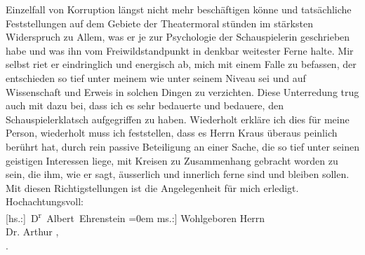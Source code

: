 \begin{ledgroupsized}[t]{13cm}
                    Einzelfall von Korruption längst nicht mehr beschäftigen könne und tatsäch{\pb}liche Feststellungen auf dem Gebiete der
                    Theatermoral stünden im stärksten Widerspruch zu Allem, was er je zur
                    Psychologie der Schauspielerin geschrieben habe und was ihn vom
                    Freiwildstandpunkt in denkbar weitester Ferne halte. Mir selbst riet er
                    eindringlich und energisch ab, mich mit einem Falle zu befassen, der entschieden
                    so tief unter meinem wie unter seinem Niveau sei und auf Wissenschaft und Erweis
                    in solchen Dingen zu verzichten. Diese Unterredung trug auch mit dazu bei, dass
                    ich es sehr bedauerte und bedauere, den Schauspielerklatsch aufgegriffen zu
                    haben. Wiederholt erkläre ich dies für meine Person, wiederholt muss ich
                    feststellen, dass es Herrn Kraus überaus
                    peinlich berührt hat, durch rein passive Beteiligung an einer Sache, die so tief
                    unter seinen geistigen Interessen liege, mit Kreisen zu Zusammenhang gebracht
                    worden zu sein, die ihm, wie er sagt, äusserlich und innerlich ferne sind und
                    bleiben sollen.\pend
           \pstart
           Mit diesen Richtigstellungen ist die Angelegenheit für mich erledigt.\pend
           \pstart
           Hochachtungsvoll:{\\[\baselineskip]}\spacefill\mbox{{[}hs.:{]} D\textsuperscript{r} Albert Ehrenstein}\pend
           \leftskip=0em{}\pstart
           \noindent{}{[}ms.:{]} Wohlgeboren Herrn{\\}Dr. Arthur ,{\\}.\pend
           
         
         \endnumbering{}\end{ledgroupsized}  \newcommand{\dateiname}{L02017}\newcommand{\titel}{Albert Ehrenstein an Arthur Schnitzler, 27. 4. 1911}\newcommand{\editorInnen}{Martin Anton Müller und Gerd-Hermann Susen}
      